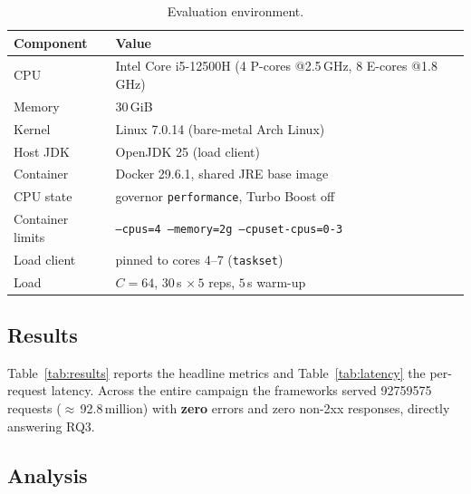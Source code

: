 \begin{table}[t]
  \centering
  \caption{Evaluation environment.}
  \label{tab:env}
  \small
  \begin{tabular}{@{}ll@{}}
    \toprule
    Component & Value \\
    \midrule
    CPU        & Intel Core i5-12500H (4 P-cores @2.5\,GHz, 8 E-cores @1.8\,GHz) \\
    Memory     & 30\,GiB \\
    Kernel     & Linux 7.0.14 (bare-metal Arch Linux) \\
    Host JDK   & OpenJDK 25 (load client) \\
    Container  & Docker 29.6.1, shared JRE base image \\
    CPU state  & governor \texttt{performance}, Turbo Boost off \\
    Container limits & \texttt{--cpus=4 --memory=2g --cpuset-cpus=0-3} \\
    Load client & pinned to cores 4--7 (\texttt{taskset}) \\
    Load        & $C=64$, $30$\,s $\times\,5$ reps, $5$\,s warm-up \\
    \bottomrule
  \end{tabular}
\end{table}

\subsection{Results}
\label{sec:eval-results}

Table~\ref{tab:results} reports the headline metrics and
Table~\ref{tab:latency} the per-request latency. Across the entire
campaign the frameworks served \num{92759575} requests
($\approx$\,92.8\,million) with \textbf{zero} errors and zero non-2xx
responses, directly answering RQ3.




\subsection{Analysis}
\label{sec:eval-analysis}

